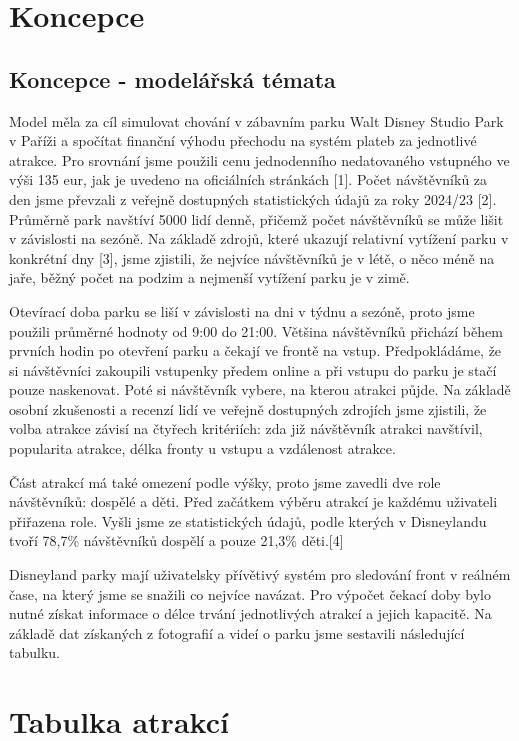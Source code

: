 \documentclass[a4paper,12pt]{article}
\begin{document}
\section{Koncepce}
\subsection{Koncepce - modelářská témata}
Model měla za cíl simulovat chování v zábavním parku Walt Disney Studio Park v Paříži a spočítat finanční výhodu přechodu na systém plateb za jednotlivé atrakce. Pro srovnání jsme použili cenu jednodenního nedatovaného vstupného ve výši 135 eur, jak je uvedeno na oficiálních stránkách [1]. Počet návštěvníků za den jsme převzali z veřejně dostupných statistických údajů za roky 2024/23 [2]. Průměrně park navštíví 5000 lidí denně, přičemž počet návštěvníků se může lišit v závislosti na sezóně. Na základě zdrojů, které ukazují relativní vytížení parku v konkrétní dny [3], jsme zjistili, že nejvíce návštěvníků je v létě, o něco méně na jaře, běžný počet na podzim a nejmenší vytížení parku je v zimě.

Otevírací doba parku se liší v závislosti na dni v týdnu a sezóně, proto jsme použili průměrné hodnoty od 9:00 do 21:00. Většina návštěvníků přichází během prvních hodin po otevření parku a čekají ve frontě na vstup. Předpokládáme, že si návštěvníci zakoupili vstupenky předem online a při vstupu do parku je stačí pouze naskenovat. Poté si návštěvník vybere, na kterou atrakci půjde. Na základě osobní zkušenosti a recenzí lidí ve veřejně dostupných zdrojích jsme zjistili, že volba atrakce závisí na čtyřech kritériích: zda již návštěvník atrakci navštívil, popularita atrakce, délka fronty u vstupu a vzdálenost atrakce.

Část atrakcí má také omezení podle výšky, proto jsme zavedli dve role návštěvníků: dospělé a děti. Před začátkem výběru atrakcí je každému uživateli přiřazena role. Vyšli jsme ze statistických údajů, podle kterých v Disneylandu tvoří 78,7\% návštěvníků dospělí a pouze 21,3\% děti.[4]

Disneyland parky mají uživatelsky přívětivý systém pro sledování front v reálném čase, na který jsme se snažili co nejvíce navázat. Pro výpočet čekací doby bylo nutné získat informace o délce trvání jednotlivých atrakcí a jejich kapacitě. Na základě dat získaných z fotografií a videí o parku jsme sestavili následující tabulku.
\section*{Tabulka atrakcí}
\end{document}
